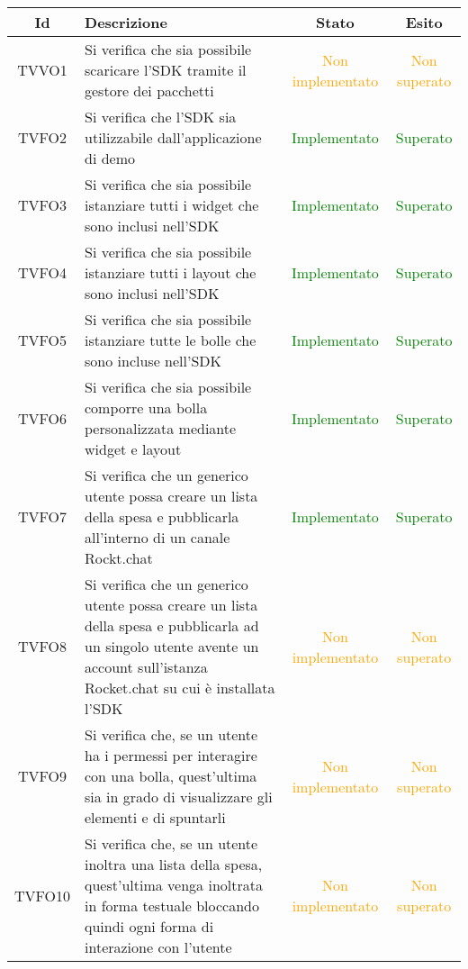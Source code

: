 \begin{center}
	\begin{longtable}{|c|>{\centering}m{10cm}|c|c|}\hline
		Id & Descrizione & Stato & Esito\\ \hline
		TVVO1 & Si verifica che sia possibile scaricare l'SDK tramite il gestore dei pacchetti \termine{Atmosphere} & \textcolor{Orange}{Non implementato} & \textcolor{Orange}{Non superato} \\ \hline
		TVFO2 & Si verifica che l'SDK sia utilizzabile dall'applicazione di demo & \textcolor{Green}{Implementato} & \textcolor{Green}{Superato} \\ \hline
		TVFO3 & Si verifica che sia possibile istanziare tutti i widget che sono inclusi nell'SDK & \textcolor{Green}{Implementato} & \textcolor{Green}{Superato} \\ \hline
		TVFO4 & Si verifica che sia possibile istanziare tutti i layout che sono inclusi nell'SDK & \textcolor{Green}{Implementato} & \textcolor{Green}{Superato} \\ \hline
		TVFO5 & Si verifica che sia possibile istanziare tutte le bolle che sono incluse nell'SDK & \textcolor{Green}{Implementato} & \textcolor{Green}{Superato} \\ \hline
		TVFO6 & Si verifica che sia possibile comporre una bolla personalizzata mediante widget e layout & \textcolor{Green}{Implementato} & \textcolor{Green}{Superato} \\ \hline
		TVFO7 & Si verifica che un generico utente possa creare un lista della spesa e pubblicarla all'interno di un canale Rockt.chat & \textcolor{Green}{Implementato} & \textcolor{Green}{Superato} \\ \hline
		TVFO8 & Si verifica che un generico utente possa creare un lista della spesa e pubblicarla ad un singolo utente avente un account sull'istanza Rocket.chat su cui è installata l'SDK & \textcolor{Orange}{Non implementato} & \textcolor{Orange}{Non superato} \\ \hline
		TVFO9 & Si verifica che, se un utente ha i permessi per interagire con una bolla, quest'ultima sia in grado di visualizzare gli elementi e di spuntarli & \textcolor{Orange}{Non implementato} & \textcolor{Orange}{Non superato} \\ \hline
		TVFO10 & Si verifica che, se un utente inoltra una lista della spesa, quest'ultima venga inoltrata in forma testuale bloccando quindi ogni forma di interazione con l'utente & \textcolor{Orange}{Non implementato} & \textcolor{Orange}{Non superato} \\ \hline

\end{longtable}
\end{center}
